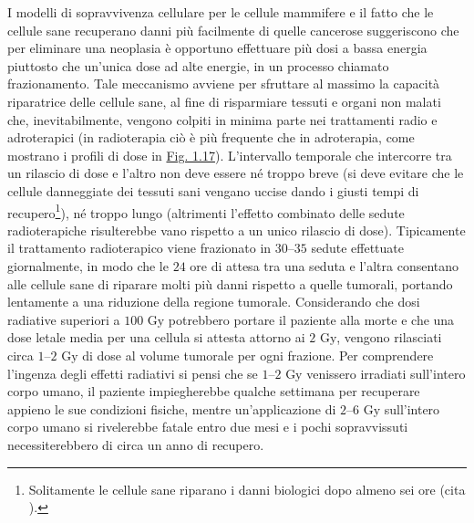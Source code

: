 \documentclass[12pt,a4paper,twoside]{report}
\begin{document}
	I modelli di sopravvivenza cellulare per le cellule mammifere e il fatto che le cellule sane recuperano danni più facilmente di quelle cancerose suggeriscono che per eliminare una neoplasia è opportuno effettuare più dosi a bassa energia piuttosto che un'unica dose ad alte energie, in un processo chiamato frazionamento. Tale meccanismo avviene per sfruttare al massimo la capacità riparatrice delle cellule sane, al fine di risparmiare tessuti e organi non malati che, inevitabilmente, vengono colpiti in minima parte nei trattamenti radio e adroterapici (in radioterapia ciò è più frequente che in adroterapia, come mostrano i profili di dose in \hyperref[fig:photon]{Fig. 1.17}). L'intervallo temporale che intercorre tra un rilascio di dose e l'altro non deve essere né troppo breve (si deve evitare che le cellule danneggiate dei tessuti sani vengano uccise dando i giusti tempi di recupero\footnote{Solitamente le cellule sane riparano i danni biologici dopo almeno sei ore (cita
		).}), né troppo lungo (altrimenti l'effetto combinato delle sedute radioterapiche risulterebbe vano rispetto a un unico rilascio di dose). Tipicamente il trattamento radioterapico viene frazionato in $30$--$35$ sedute effettuate giornalmente, in modo che le $24$ ore di attesa tra una seduta e l'altra consentano alle cellule sane di riparare molti più danni rispetto a quelle tumorali, portando lentamente a una riduzione della regione tumorale. Considerando che dosi radiative superiori a $100 \mbox{ Gy}$ potrebbero portare il paziente alla morte e che una dose letale media per una cellula si attesta attorno ai $2 \mbox{ Gy}$, vengono rilasciati circa $1$--$2\mbox{ Gy}$ di dose al volume tumorale per ogni frazione. Per comprendere l'ingenza degli effetti radiativi si pensi che se $1$--$2\mbox{ Gy}$ venissero irradiati sull'intero corpo umano, il paziente impiegherebbe qualche settimana per recuperare appieno le sue condizioni fisiche, mentre un'applicazione di $2$--$6\mbox{ Gy}$ sull'intero corpo umano si rivelerebbe fatale entro due mesi e i pochi sopravvissuti necessiterebbero di circa un anno di recupero.
		
\end{document}
